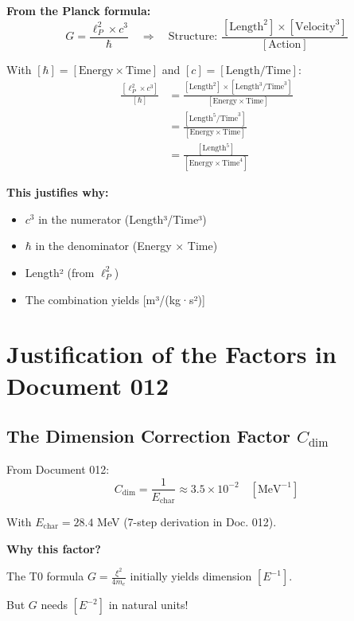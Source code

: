 	\textbf{From the Planck formula:}
	\begin{equation}
		G = \frac{\ell_P^2 \times c^3}{\hbar} \quad \Rightarrow \quad \text{Structure: } \frac{[\text{Length}^2] \times [\text{Velocity}^3]}{[\text{Action}]}
	\end{equation}
	
	With $[\hbar] = [\text{Energy} \times \text{Time}]$ and $[c] = [\text{Length}/\text{Time}]$:
	\begin{align}
		\frac{[\ell_P^2 \times c^3]}{[\hbar]} &= \frac{[\text{Length}^2] \times [\text{Length}^3/\text{Time}^3]}{[\text{Energy} \times \text{Time}]} \\
		&= \frac{[\text{Length}^5/\text{Time}^3]}{[\text{Energy} \times \text{Time}]} \\
		&= \frac{[\text{Length}^5]}{[\text{Energy} \times \text{Time}^4]}
	\end{align}
	
	\textbf{This justifies why:}
	\begin{itemize}
		\item $c^3$ in the numerator (Length³/Time³)
		\item $\hbar$ in the denominator (Energy × Time)
		\item Length² (from $\ell_P^2$)
		\item The combination yields [m³/(kg·s²)]
	\end{itemize}
	
	\section{Justification of the Factors in Document 012}
	
	\subsection{The Dimension Correction Factor $C_{\text{dim}}$}
	
	From Document 012:
	\begin{equation}
		C_{\text{dim}} = \frac{1}{E_{\text{char}}} \approx 3.5 \times 10^{-2} \quad [\text{MeV}^{-1}]
	\end{equation}
	
	With $E_{\text{char}} = 28.4$ MeV (7-step derivation in Doc. 012).
	
	\textbf{Why this factor?}
	
	The T0 formula $G = \frac{\xi^2}{4m_e}$ initially yields dimension $[E^{-1}]$.
	
	But $G$ needs $[E^{-2}]$ in natural units!
	
